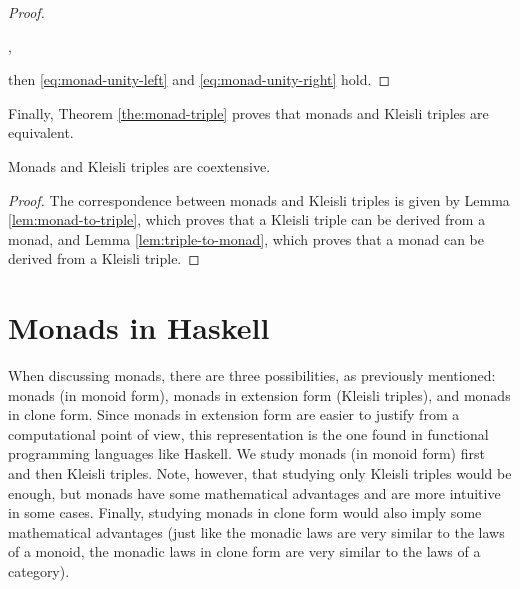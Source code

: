 \begin{lemma}
\begin{proof}
\begin{steps}
        \eqby{\eqref{eq:triple-unity-right}}
      ,
    \end{steps}
    then \eqref{eq:monad-unity-left} and \eqref{eq:monad-unity-right}
    hold.

  \end{proof}

\end{lemma}

Finally, Theorem \ref{the:monad-triple} proves that monads and Kleisli triples
are equivalent.

\begin{theorem}
  \label{the:monad-triple}

  Monads and Kleisli triples are coextensive.

  \begin{proof}

    The correspondence between monads and Kleisli triples is given by Lemma
    \ref{lem:monad-to-triple}, which proves that a Kleisli triple can be
    derived from a monad, and Lemma \ref{lem:triple-to-monad}, which proves
    that a monad can be derived from a Kleisli triple.

  \end{proof}

\end{theorem}

\begin{example}
  \label{ex:monad-triple-identity}

\end{example}


\section{Monads in Haskell}
\label{sec:monads-haskell}

When discussing monads, there are three possibilities, as previously
mentioned: monads (in monoid form), monads in extension form (Kleisli
triples), and monads in clone form. Since monads in extension form are
easier to justify from a computational point of view, this
representation is the one found in functional programming languages
like Haskell. We study monads (in monoid form) first and then Kleisli
triples. Note, however, that studying only Kleisli triples would be
enough, but monads have some mathematical advantages and are more
intuitive in some cases. Finally, studying monads in clone form would
also imply some mathematical advantages (just like the monadic laws
are very similar to the laws of a monoid, the monadic laws in clone
form are very similar to the laws of a category).

